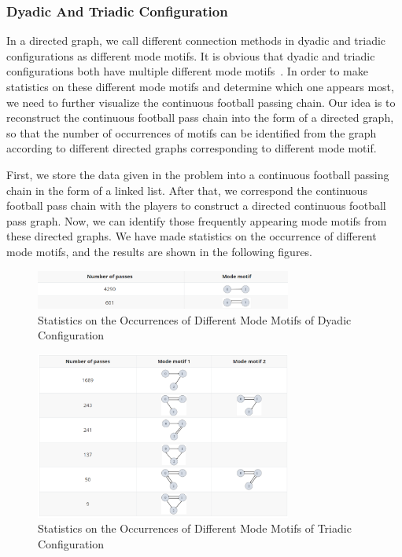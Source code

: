 \documentclass{mcmthesis}
\begin{document}
\subsubsection{Dyadic And Triadic Configuration}
	In a directed graph, we call different connection methods in dyadic and triadic configurations as different mode motifs.  It is obvious that dyadic and triadic configurations both have multiple different mode motifs~\cite{Second}.  In order to make statistics on these different mode motifs and determine which one appears most, we need to further visualize the continuous football passing chain.  Our idea is to reconstruct the continuous football pass chain into the form of a directed graph, so that the number of occurrences of motifs can be identified from the graph according to different directed graphs corresponding to different mode motif.

	First, we store the data given in the problem into a continuous football passing chain in the form of a linked list.  After that, we correspond the continuous football pass chain with the players to construct a directed continuous football pass graph.  Now, we can identify those frequently appearing mode motifs from these directed graphs.  We have made statistics on the occurrence of different mode motifs, and the results are shown in the following figures.

	\begin{figure}[h]
		\centering
		\includegraphics[width=0.75\textwidth]{figures/motif2.png}
		\caption{Statistics on the Occurrences of Different Mode Motifs of Dyadic Configuration}
		\label{fig:motif2}
	\end{figure}
	\begin{figure}[h]
		\centering
		\includegraphics[width=0.75\textwidth]{figures/motif3.png}
		\caption{Statistics on the Occurrences of Different Mode Motifs of Triadic Configuration}
		\label{fig:motif3}
	\end{figure}
	
\end{document}
